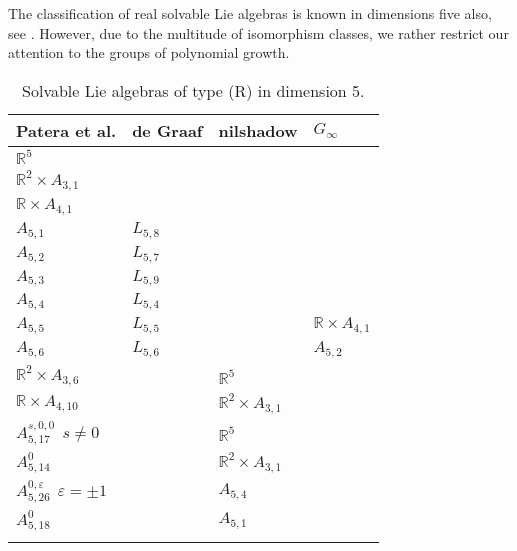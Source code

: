 \documentclass[a4paper,12pt]{amsart}
\theoremstyle{plain}
\theoremstyle{definition}
\theoremstyle{plain}
\theoremstyle{remark}
\newcommand\YT{\rule{0pt}{2.6ex}}       %
\newcommand\AT{\rule[-1.2ex]{0pt}{0pt}} %
\newcommand{\laina}[1]{``#1''}
\begin{document}
\label{sec:5D}

The classification of real solvable Lie algebras is known in dimensions five also, see \cite{avain:Patera}. However, due to the multitude of isomorphism classes, we rather restrict our attention to the groups of polynomial growth.



\begin{table}[htb]
	\begin{tabular}{llll}
		\textbf{Patera et al.} & \textbf{de Graaf} &  \textbf{nilshadow} & \( G_\infty \) 
		\\	\hline
		\( \mathbb{R}^5 \) &   &  &  \AT \YT
		\\	\hline
		\( \mathbb{R}^2 \times A_{3,1} \) &   &  &  \AT \YT
		\\	\hline
		\( \mathbb{R} \times A_{4,1} \) &   &  &  \AT \YT
		\\	\hline
		\( A_{5,1} \) &  \(L_{5,8}\) &  &  \AT \YT
		\\	\hline
		\( A_{5,2} \) & \( L_{5,7} \)  &  &  \AT \YT
		\\	\hline
		\( A_{5,3} \) &  \(L_{5,9}\) &  &  \AT \YT
		\\	\hline
		\( A_{5,4} \) & \( L_{5,4} \)  &  &  \AT \YT
		\\	\hline
		\( A_{5,5} \) &  \(L_{5,5}\) &  & \( \mathbb{R} \times A_{4,1} \)  \AT \YT
		\\	\hline
		\( A_{5,6} \) & \( L_{5,6} \)  &  & \( A_{5,2} \) \AT \YT
		\\	\hline
		\( \mathbb{R}^2 \times A_{3,6} \) &  & \( \mathbb{R}^5 \) &  \AT \YT
		\\	\hline
		\( \mathbb{R} \times  A_{4,10} \) &  & \( \mathbb{R}^2 \times A_{3,1} \) &  \AT \YT
		\\	\hline
		\( A_{5,17}^{s,0,0} \: \: s \neq 0 \) &  & \( \mathbb{R}^5  \) &  \AT \YT
		\\	\hline
		\( A_{5,14}^0 \) &  & \( \mathbb{R}^2 \times A_{3,1} \) &  \AT \YT
		\\	\hline
		\( A_{5,26}^{0, \varepsilon} \:\: \varepsilon= \pm 1 \) &  & \( A_{5,4} \) &  \AT \YT
		\\	\hline
		\( A_{5,18}^{0} \) &  & \( A_{5,1} \) &  \AT \YT
		\\ \hline \\
	\end{tabular}
	\caption{Solvable Lie algebras of type (R) in dimension 5.}
	\label{table:5d-poly-growth}
\end{table}
\end{document}
